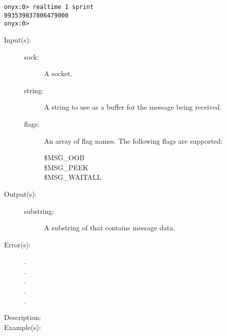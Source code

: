 \begin{description}
\begin{description}
\begin{verbatim}
onyx:0> realtime 1 sprint
993539837806479000
onyx:0>
		\end{verbatim}
	\end{description}
\label{systemdict:recv}
\item[{\onyxop{sock string flags}{recv}{substring}}: ]
\item[{\onyxop{sock string}{recv}{substring}}: ]
	\begin{description}\item[]
	\item[Input(s): ]
		\begin{description}\item[]
		\item[sock: ]
			A socket.
		\item[string: ]
			A string to use as a buffer for the message being
			received.
		\item[flags: ]
			An array of flag names.  The following flags are
			supported:
			\begin{description}%
			\item[\$MSG\_OOB]
			\item[\$MSG\_PEEK]
			\item[\$MSG\_WAITALL]
			\end{description}
		\end{description}
	\item[Output(s): ]
		\begin{description}\item[]
		\item[substring: ]
			A substring of  that contains message
			data.
		\end{description}
	\item[Error(s): ]
		\begin{description}\item[]
		\item[.]
		\item[.]
		\item[.]
		\item[.]
		\item[.]
		\end{description}
	\item[Description: ]
	\item[Example(s): ]\begin{verbatim}


\end{verbatim}
\end{description}
\end{description}
